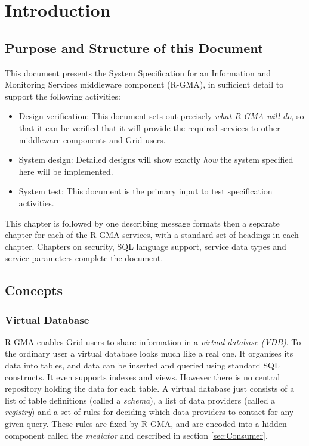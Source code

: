 \section{Introduction}\label{sec:Introduction}

\subsection{Purpose and Structure of this Document}

This document presents the System Specification for an Information and
Monitoring Services middleware component (R-GMA), in sufficient detail to
support the following activities:

\begin{itemize}
  \item Design verification: This document sets out precisely \textit{what
  R-GMA will do}, so that it can be verified that it will provide the required
  services to other middleware components and Grid users.
  
  \item System design: Detailed designs will show exactly
  \textit{how} the system specified here will be implemented.
  
  \item System test: This document is the primary input to test
  specification activities.
\end{itemize}

This chapter is followed by one describing message formats then
a separate chapter for each of the R-GMA services, with a standard set of
headings in each chapter. Chapters on security, SQL language support, service data types and service parameters
complete the document.

\subsection{Concepts}
\subsubsection{Virtual Database}
R-GMA enables Grid users to share information in a \textit{virtual
database
(VDB)}. To the ordinary user a
virtual database looks much like a real one. It organises its data
into tables, and data can be inserted and queried using standard SQL
constructs. It even supports indexes and views. However there is no
central repository holding the data for each table. A virtual database
just consists of a list of table definitions (called a
\textit{schema}), a list of data providers (called a
\textit{registry}) and a set of rules for deciding
which data providers to contact for any given query. These rules are
fixed by R-GMA, and are encoded into a hidden component called the
\textit{mediator} and described in section \ref{sec:Consumer}.

